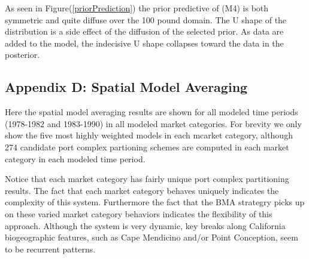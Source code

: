 \documentclass[12pt]{article}
\begin{document}
As seen in Figure(\ref{priorPrediction}) the prior predictive of (M4) is
both symmetric and quite diffuse over the 100 pound domain. The U shape
of the distribution is a side effect of the diffusion of the selected
prior. As data are added to the model, the indecisive U shape collapses
toward the data in the posterior.

\subsection{Appendix D: Spatial Model
Averaging}\label{appendix-d-spatial-model-averaging}

Here the spatial model averaging results are shown for all modeled time
periods (1978-1982 and 1983-1990) in all modeled market categories. For
brevity we only show the five most highly weighted models in each
mcarket category, although 274 candidate port complex partioning schemes
are computed in each market category in each modeled time period.

Notice that each market category has fairly unique port complex
partitioning results. The fact that each market category behaves
uniquely indicates the complexity of this system. Furthermore the fact
that the BMA strategry picks up on these varied market category
behaviors indicates the flexibility of this approach. Although the
system is very dynamic, key breaks along California biogeographic
features, such as Cape Mendicino and/or Point Conception, seem to be
recurrent patterns.
\end{document}
